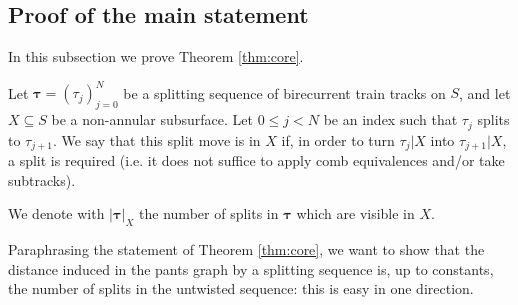 \subsection{Proof of the main statement}\label{sub:conclusion}

In this subsection we prove Theorem \ref{thm:core}.

\begin{defin}
Let $\bm\tau=(\tau_j)_{j=0}^N$ be a splitting sequence of birecurrent train tracks on $S$, and let $X\subseteq S$ be a non-annular subsurface. Let $0\leq j <N$ be an index such that $\tau_j$ splits to $\tau_{j+1}$. We say that this split move is  in $X$ if, in order to turn $\tau_j|X$ into $\tau_{j+1}|X$, a split is required (i.e. it does not suffice to apply comb equivalences and/or take subtracks).

We denote with $|\bm\tau|_X$ the number of splits in $\bm\tau$ which are visible in $X$.
\end{defin}


Paraphrasing the statement of Theorem \ref{thm:core}, we want to show that the distance induced in the pants graph by a splitting sequence is, up to constants, the number of splits in the untwisted sequence: this is easy in one direction.


